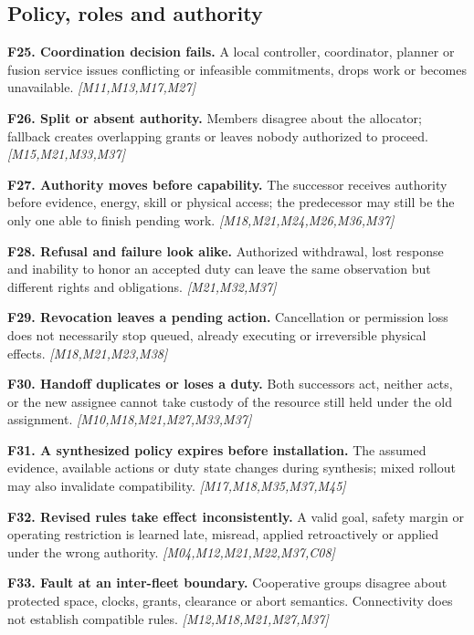 \documentclass[11pt]{article}
\newcommand{\f}[4]{\par\smallskip\noindent\textbf{#1. #2.} #3 \textit{[#4]}\par}
\begin{document}
\subsection{Policy, roles and authority}
\f{F25}{Coordination decision fails}{A local controller, coordinator, planner or fusion service issues conflicting or infeasible commitments, drops work or becomes unavailable.}{M11,M13,M17,M27}
\f{F26}{Split or absent authority}{Members disagree about the allocator; fallback creates overlapping grants or leaves nobody authorized to proceed.}{M15,M21,M33,M37}
\f{F27}{Authority moves before capability}{The successor receives authority before evidence, energy, skill or physical access; the predecessor may still be the only one able to finish pending work.}{M18,M21,M24,M26,M36,M37}
\f{F28}{Refusal and failure look alike}{Authorized withdrawal, lost response and inability to honor an accepted duty can leave the same observation but different rights and obligations.}{M21,M32,M37}
\f{F29}{Revocation leaves a pending action}{Cancellation or permission loss does not necessarily stop queued, already executing or irreversible physical effects.}{M18,M21,M23,M38}
\f{F30}{Handoff duplicates or loses a duty}{Both successors act, neither acts, or the new assignee cannot take custody of the resource still held under the old assignment.}{M10,M18,M21,M27,M33,M37}
\f{F31}{A synthesized policy expires before installation}{The assumed evidence, available actions or duty state changes during synthesis; mixed rollout may also invalidate compatibility.}{M17,M18,M35,M37,M45}
\f{F32}{Revised rules take effect inconsistently}{A valid goal, safety margin or operating restriction is learned late, misread, applied retroactively or applied under the wrong authority.}{M04,M12,M21,M22,M37,C08}
\f{F33}{Fault at an inter-fleet boundary}{Cooperative groups disagree about protected space, clocks, grants, clearance or abort semantics. Connectivity does not establish compatible rules.}{M12,M18,M21,M27,M37}
\end{document}
